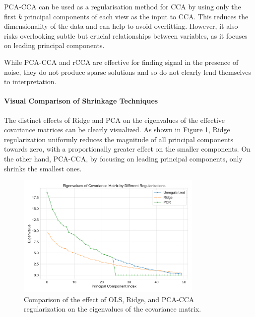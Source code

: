 PCA-CCA can be used as a regularisation method for CCA by using only the first \( k \) principal components of each view as the input to CCA.
This reduces the dimensionality of the data and can help to avoid overfitting.
However, it also risks overlooking subtle but crucial relationships between variables, as it focuses on leading principal components.

While PCA-CCA and rCCA are effective for finding signal in the presence of noise, they do not produce sparse
solutions and so do not clearly lend themselves to interpretation.

\paragraph{Visual Comparison of Shrinkage Techniques}

The distinct effects of Ridge and PCA on the eigenvalues of the effective covariance matrices can be clearly visualized.
As shown in Figure \ref{fig:shrinkage}, Ridge regularization uniformly reduces the magnitude of all principal components towards zero, with a proportionally greater effect on the smaller components.
On the other hand, PCA-CCA, by focusing on leading principal components, only shrinks the smallest ones.

\begin{figure}[htbp]
    \centering
    \includegraphics[width=0.8\textwidth]{figures/regularisation/shrinkage/shrinkage.svg}
    \caption{Comparison of the effect of OLS, Ridge, and PCA-CCA regularization on the eigenvalues of the covariance matrix.}
    \label{fig:shrinkage}
\end{figure}

